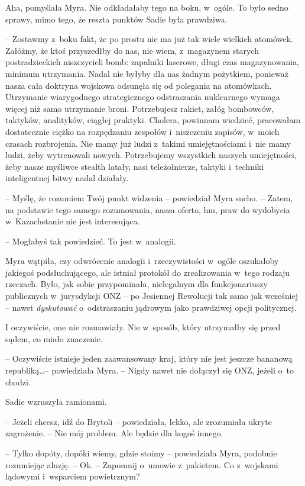 \documentclass[oneside,polish,11pt,sfheadings]{mwbk}
\begin{document}
Aha, pomyślała Myra. Nie odkładałaby tego na boku, w~ogóle. To było
sedno sprawy, mimo tego, że reszta punktów Sadie była prawdziwa.

-- Zostawmy z~boku fakt, że po prostu nie ma już tak wiele wielkich
atomówek. Załóżmy, że ktoś przyszedłby do nas, nie wiem, z~magazynem
starych postradzieckich niszczycieli bomb: zapalniki laserowe, długi
czas magazynowania, minimum utrzymania. Nadal nie byłyby dla nas żadnym
pożytkiem, ponieważ nasza cała doktryna wojskowa odsunęła się od
polegania na atomówkach. Utrzymanie wiarygodnego strategicznego
odstraszania nuklearnego wymaga więcej niż samo utrzymanie broni.
Potrzebujesz rakiet, załóg bombowców, taktyków, analityków, ciągłej
praktyki. Cholera, powinnam wiedzieć, pracowałam dostatecznie ciężko na
rozpędzaniu zespołów i~niszczeniu zapisów, w~moich czasach rozbrojenia.
Nie mamy już ludzi z~takimi umiejętnościami i~nie mamy ludzi, żeby
wytrenowali nowych. Potrzebujemy wszystkich naszych umiejętności, żeby
nasze myśliwce stealth latały, nasi teleżołnierze, taktyki i~techniki
inteligentnej bitwy nadal działały.

-- Myślę, że rozumiem Twój punkt widzenia -- powiedział Myra sucho. -- Zatem, na podstawie tego samego rozumowania, nasza oferta, hm, praw do
wydobycia w~Kazachstanie nie jest interesująca.

-- Mogłabyś tak powiedzieć. To jest w~analogii.

Myra wątpiła, czy odwrócenie analogii i~rzeczywistości w~ogóle
oszukałoby jakiegoś podsłuchującego, ale istniał protokół do
zrealizowania w~tego rodzaju rzeczach. Było, jak sobie przypominała,
nielegalnym dla funkcjonariuszy publicznych w~jurysdykcji ONZ -- po
Jesiennej Rewolucji tak samo jak wcześniej -- nawet \textit{dyskutować} o~odstraszaniu jądrowym jako prawdziwej opcji politycznej.

I oczywiście, one nie rozmawiały. Nie w~sposób, który utrzymałby się
przed sądem, co miało znaczenie.

-- Oczywiście istnieje jeden zaawansowany kraj, który nie jest jeszcze
bananową republiką\ldots -- powiedziała Myra. -- Nigdy nawet nie dołączył się
ONZ, jeżeli o~to chodzi.

Sadie wzruszyła ramionami. 

-- Jeżeli chcesz, idź do Brytoli -- powiedziała, lekko, ale zrozumiała ukryte zagrożenie. -- Nie mój problem.
Ale będzie dla kogoś innego.

-- Tylko dopóty, dopóki wiemy, gdzie stoimy -- powiedziała Myra, podobnie
rozumiejąc aluzję. -- Ok. -- Zapomnij o~umowie z~pakietem. Co z~wojskami
lądowymi i~wsparciem powietrznym?
\end{document}
